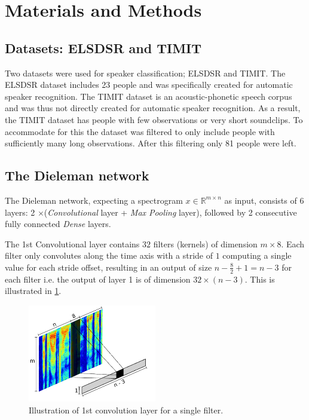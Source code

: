 \section{Materials and Methods}

\subsection{Datasets: ELSDSR and TIMIT}

Two datasets were used for speaker classification; ELSDSR and TIMIT. The ELSDSR dataset includes 23 people and was specifically created for automatic speaker recognition. The TIMIT dataset is an acoustic-phonetic speech corpus and was thus not directly created for automatic speaker recognition. As a result, the TIMIT dataset has people with few observations or very short soundclips. To accommodate for this the dataset was filtered to only include people with sufficiently many long observations. After this filtering only 81 people were left.

\subsection{The Dieleman network}

The Dieleman network, expecting a spectrogram $x \in \mathbb{R}^{m \times n}$ as input, consists of 6 layers: 2 $\times$(\emph{Convolutional} layer + \emph{Max Pooling} layer), followed by 2 consecutive fully connected \emph{Dense} layers.

The 1st Convolutional layer contains $32$ filters (kernels) of dimension $m \times 8$. Each filter only convolutes along the time axis with a stride of $1$ computing a single value for each stride offset, resulting in an output of size $n - \frac{8}{2} + 1 = n - 3$ for each filter i.e. the output of layer 1 is of dimension $32 \times (n-3)$. This is illustrated in \cref{fig:convolution-1}.

\begin{figure}[H]
  \centering
  \includegraphics[width=0.5\textwidth]{inkscape/convolution.pdf}
  \caption{Illustration of 1st convolution layer for a single filter.}
  \label{fig:convolution-1}
\end{figure}

